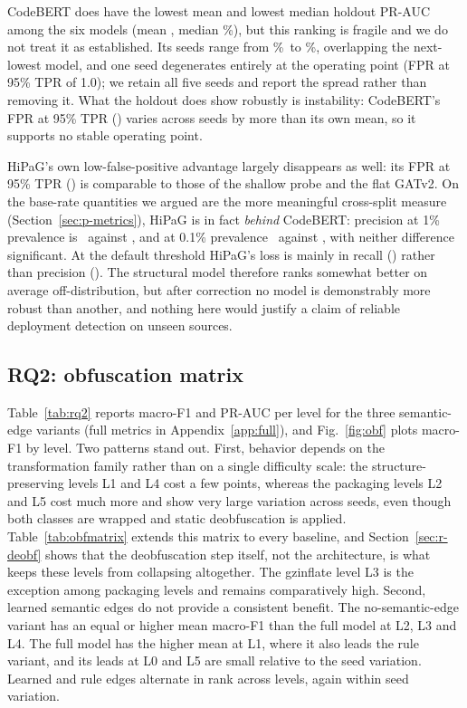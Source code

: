 \documentclass[pdflatex,sn-mathphys-num]{sn-jnl}
\begin{document}
CodeBERT does have the lowest mean and lowest median holdout PR-AUC among the
six models (mean \RqOneCodeBertHoldoutPrAuc, median
\RqOneCodeBertHoldoutPrAucMedian\%), but this ranking is fragile and we do not
treat it as established. Its seeds range from
\RqOneCodeBertHoldoutPrAucMin\%\ to \RqOneCodeBertHoldoutPrAucMax\%, overlapping
the next-lowest model, and one seed degenerates entirely at the operating point
(FPR at 95\% TPR of 1.0); we retain all five seeds and report the spread rather
than removing it. What the holdout does show robustly is instability: CodeBERT's
FPR at 95\% TPR (\RqOneCodeBertHoldoutFprAtTprNineFive) varies across seeds by
more than its own mean, so it supports no stable operating point.

HiPaG's own low-false-positive advantage largely disappears as well: its FPR at
95\% TPR (\HiPaGHoldoutFprAtTprNineFive) is comparable to those of the shallow
probe and the flat GATv2. On the base-rate quantities we argued are the more
meaningful cross-split measure (Section~\ref{sec:p-metrics}), HiPaG is in fact
\emph{behind} CodeBERT: precision at 1\% prevalence is
\HiPaGHoldoutPrecAtBaseOnePct\ against \RqOneCodeBertHoldoutPrecAtBaseOnePct,
and at 0.1\% prevalence \HiPaGHoldoutPrecAtBaseZeroPOnePct\ against
\RqOneCodeBertHoldoutPrecAtBaseZeroPOnePct, with neither difference significant.
At the default threshold HiPaG's loss is mainly in recall
(\HiPaGHoldoutRecall) rather than precision (\HiPaGHoldoutPrecision). The
structural model therefore ranks somewhat better on average off-distribution,
but after correction no model is demonstrably more robust than another, and
nothing here would justify a claim of reliable deployment detection on unseen
sources.

\subsection{RQ2: obfuscation matrix}\label{sec:r-rq2}
Table~\ref{tab:rq2} reports macro-F1 and PR-AUC per level for the three
semantic-edge variants (full metrics in Appendix~\ref{app:full}), and
Fig.~\ref{fig:obf} plots macro-F1 by level. Two patterns stand out. First,
behavior depends on the transformation family rather than on a single
difficulty scale: the structure-preserving levels L1 and L4 cost a few points,
whereas the packaging levels L2 and L5 cost much more and show very large
variation across seeds, even though both classes are wrapped and static
deobfuscation is applied. Table~\ref{tab:obfmatrix} extends this matrix to
every baseline, and Section~\ref{sec:r-deobf} shows that the deobfuscation step
itself, not the architecture, is what keeps these levels from collapsing
altogether. The gzinflate level L3 is the exception among
packaging levels and remains comparatively high. Second, learned semantic edges
do not provide a consistent benefit. The no-semantic-edge variant has an equal
or higher mean macro-F1 than the full model at L2, L3 and L4. The full model
has the higher mean at L1, where it also leads the rule variant, and its leads
at L0 and L5 are small relative to the seed variation. Learned and rule edges
alternate in rank across levels, again within seed variation.
\end{document}
